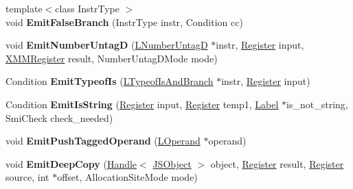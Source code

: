 \begin{DoxyCompactItemize}
\item 
{\footnotesize template$<$class Instr\+Type $>$ }\\void {\bfseries Emit\+False\+Branch} (Instr\+Type instr, Condition cc)\hypertarget{classv8_1_1internal_1_1_l_code_gen_a24f4472aa51899a74a69b6280585d3b6}{}\label{classv8_1_1internal_1_1_l_code_gen_a24f4472aa51899a74a69b6280585d3b6}

\item 
void {\bfseries Emit\+Number\+UntagD} (\hyperlink{classv8_1_1internal_1_1_l_number_untag_d}{L\+Number\+UntagD} $\ast$instr, \hyperlink{structv8_1_1internal_1_1_register}{Register} input, \hyperlink{structv8_1_1internal_1_1_double_register}{X\+M\+M\+Register} result, Number\+Untag\+D\+Mode mode)\hypertarget{classv8_1_1internal_1_1_l_code_gen_a75cfba41e0395f88505e70199c5a3ecb}{}\label{classv8_1_1internal_1_1_l_code_gen_a75cfba41e0395f88505e70199c5a3ecb}

\item 
Condition {\bfseries Emit\+Typeof\+Is} (\hyperlink{classv8_1_1internal_1_1_l_typeof_is_and_branch}{L\+Typeof\+Is\+And\+Branch} $\ast$instr, \hyperlink{structv8_1_1internal_1_1_register}{Register} input)\hypertarget{classv8_1_1internal_1_1_l_code_gen_a06f252ea52c3c12e6489c065c4304795}{}\label{classv8_1_1internal_1_1_l_code_gen_a06f252ea52c3c12e6489c065c4304795}

\item 
Condition {\bfseries Emit\+Is\+String} (\hyperlink{structv8_1_1internal_1_1_register}{Register} input, \hyperlink{structv8_1_1internal_1_1_register}{Register} temp1, \hyperlink{classv8_1_1internal_1_1_label}{Label} $\ast$is\+\_\+not\+\_\+string, Smi\+Check check\+\_\+needed)\hypertarget{classv8_1_1internal_1_1_l_code_gen_a23c72e27a6bf50a391c940939754673d}{}\label{classv8_1_1internal_1_1_l_code_gen_a23c72e27a6bf50a391c940939754673d}

\item 
void {\bfseries Emit\+Push\+Tagged\+Operand} (\hyperlink{classv8_1_1internal_1_1_l_operand}{L\+Operand} $\ast$operand)\hypertarget{classv8_1_1internal_1_1_l_code_gen_a4c74d29dbe6012e87243f65b8a94b4e5}{}\label{classv8_1_1internal_1_1_l_code_gen_a4c74d29dbe6012e87243f65b8a94b4e5}

\item 
void {\bfseries Emit\+Deep\+Copy} (\hyperlink{classv8_1_1internal_1_1_handle}{Handle}$<$ \hyperlink{classv8_1_1internal_1_1_j_s_object}{J\+S\+Object} $>$ object, \hyperlink{structv8_1_1internal_1_1_register}{Register} result, \hyperlink{structv8_1_1internal_1_1_register}{Register} source, int $\ast$offset, Allocation\+Site\+Mode mode)\hypertarget{classv8_1_1internal_1_1_l_code_gen_a1a84a4d1ebc9ba8736407dd2a6d1214a}{}\label{classv8_1_1internal_1_1_l_code_gen_a1a84a4d1ebc9ba8736407dd2a6d1214a}


\end{DoxyCompactItemize}
